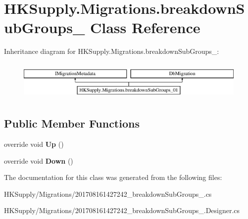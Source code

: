 \hypertarget{class_h_k_supply_1_1_migrations_1_1breakdown_sub_groups__01}{}\section{H\+K\+Supply.\+Migrations.\+breakdown\+Sub\+Groups\+\_ Class Reference}
\label{class_h_k_supply_1_1_migrations_1_1breakdown_sub_groups__01}
Inheritance diagram for H\+K\+Supply.\+Migrations.\+breakdown\+Sub\+Groups\+\_\+:\begin{figure}[H]
\begin{center}
\leavevmode
\includegraphics[height=1.937716cm]{class_h_k_supply_1_1_migrations_1_1breakdown_sub_groups__01}
\end{center}
\end{figure}
\subsection*{Public Member Functions}
\begin{DoxyCompactItemize}
\item 
\mbox{\label{class_h_k_supply_1_1_migrations_1_1breakdown_sub_groups__01_af67de7f057d24c18ddcce8a8fd8036b8}} 
override void {\bfseries Up} ()
\item 
\mbox{\label{class_h_k_supply_1_1_migrations_1_1breakdown_sub_groups__01_a2dbad7a65fdd7b9ffe85fb4e65b51862}} 
override void {\bfseries Down} ()
\end{DoxyCompactItemize}


The documentation for this class was generated from the following files\+:\begin{DoxyCompactItemize}
\item 
H\+K\+Supply/\+Migrations/201708161427242\+\_\+breakdown\+Sub\+Groups\+\_.\+cs\item 
H\+K\+Supply/\+Migrations/201708161427242\+\_\+breakdown\+Sub\+Groups\+\_.\+Designer.\+cs\end{DoxyCompactItemize}
